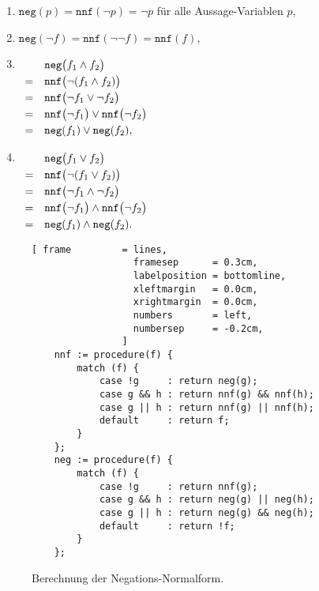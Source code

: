 \begin{enumerate}
\item $\texttt{neg}(p) = \mathtt{nnf}(\neg p) = \neg p$ f\"{u}r alle Aussage-Variablen $p$,
\item $\texttt{neg}(\neg f) = \mathtt{nnf}(\neg \neg f) = \mathtt{nnf}(f)$,
\item $\begin{array}[t]{cl}
         & \texttt{neg}\bigl(f_1 \wedge f_2 \bigr) \\[0.1cm]
       = & \mathtt{nnf}\bigl(\neg(f_1 \wedge f_2)\bigr) \\[0.1cm]
       = & \mathtt{nnf}\bigl(\neg f_1 \vee \neg f_2\bigr) \\[0.1cm]
       = & \mathtt{nnf}\bigl(\neg f_1\bigr) \vee \mathtt{nnf}\bigl(\neg f_2\bigr) \\[0.1cm]
       = & \mathtt{neg}(f_1) \vee \mathtt{neg}(f_2),
       \end{array}
      $
\item $\begin{array}[t]{cl}
         & \texttt{neg}\bigl(f_1 \vee f_2 \bigr)        \\[0.1cm]
       = & \texttt{nnf}\bigl(\neg(f_1 \vee f_2) \bigr)  \\[0.1cm]
       = & \texttt{nnf}\bigl(\neg f_1 \wedge \neg f_2 \bigr)  \\[0.1cm]
       = & \texttt{nnf}\bigl(\neg f_1\bigr) \wedge \mathtt{nnf}\bigl(\neg f_2 \bigr)  \\[0.1cm]
       = & \mathtt{neg}(f_1) \wedge \mathtt{neg}(f_2). 
       \end{array}
      $
\end{enumerate}

\begin{figure}[!ht]
  \centering
\begin{Verbatim}[ frame         = lines, 
                  framesep      = 0.3cm, 
                  labelposition = bottomline,
                  xleftmargin   = 0.0cm,
                  xrightmargin  = 0.0cm,
                  numbers       = left,
                  numbersep     = -0.2cm,
                ]
    nnf := procedure(f) {
        match (f) {
            case !g     : return neg(g);
            case g && h : return nnf(g) && nnf(h);
            case g || h : return nnf(g) || nnf(h);
            default     : return f; 
        }
    };
    neg := procedure(f) {
        match (f) {
            case !g     : return nnf(g);
            case g && h : return neg(g) || neg(h);
            case g || h : return neg(g) && neg(h);
            default     : return !f; 
        }
    };
\end{Verbatim}
\vspace*{-0.3cm}
  \caption{Berechnung der Negations-Normalform.}
  \label{fig:nnf}
\end{figure}


